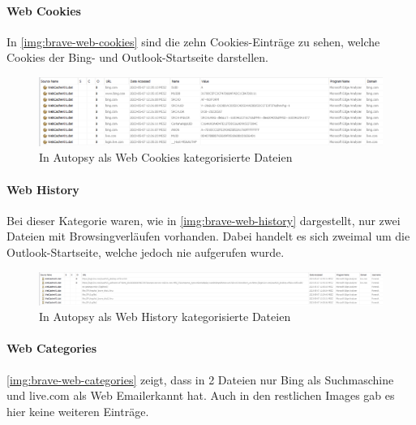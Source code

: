 \begin{appendices}
\paragraph*{Web Cookies}
In \autoref{img:brave-web-cookies} sind die zehn Cookies-Einträge zu sehen, welche Cookies der Bing- und Outlook-Startseite darstellen. 

\begin{figure}[ht]
	\centering
	\includegraphics[width=\textwidth]{bilder/BRCoo.png}
	\caption{In Autopsy als \glqq{}Web Cookies\grqq{} kategorisierte Dateien}
	\label{img:brave-web-cookies}  
\end{figure}

\paragraph*{Web History}

Bei dieser Kategorie waren, wie in \autoref{img:brave-web-history} dargestellt, nur zwei Dateien mit Browsingverläufen vorhanden. Dabei handelt es sich zweimal um die Outlook-Startseite, welche jedoch nie aufgerufen wurde.

\begin{figure}[ht]
	\centering
	\includegraphics[width=\textwidth]{bilder/BRHis.png}
	\caption{In Autopsy als \glqq{}Web History\grqq{} kategorisierte Dateien}
	\label{img:brave-web-history}  
\end{figure}

\paragraph*{Web Categories}
\autoref{img:brave-web-categories} zeigt, dass in 2 Dateien nur Bing als Suchmaschine und live.com als \glqq{}Web Email\grqq erkannt hat. Auch in den restlichen Images gab es hier keine weiteren Einträge.



\end{appendices}

